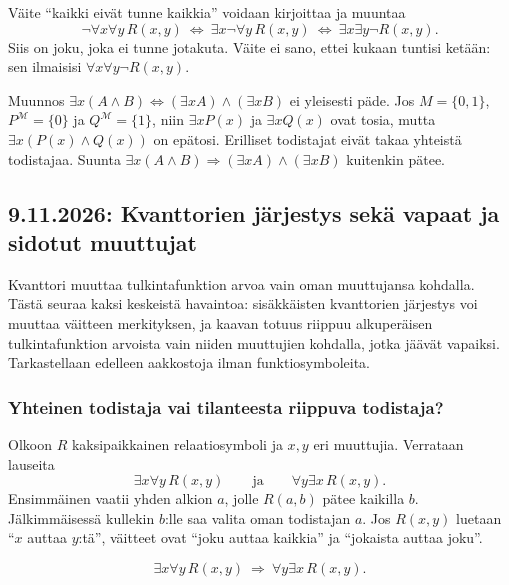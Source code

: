 \documentclass[11pt,a4paper]{amsart}
\begin{document}
\begin{example}
  Väite ``kaikki eivät tunne kaikkia'' voidaan kirjoittaa ja muuntaa
  \[
    \neg\forall x\forall y\,R(x,y)
    \ \Leftrightarrow\ \exists x\neg\forall y\,R(x,y)
    \ \Leftrightarrow\ \exists x\exists y\neg R(x,y).
  \]
  Siis on joku, joka ei tunne jotakuta. Väite ei sano, ettei kukaan
  tuntisi ketään: sen ilmaisisi $\forall x\forall y\neg R(x,y)$.
\end{example}

\begin{example}
  Muunnos $\exists x(A\land B)\Leftrightarrow
  (\exists x A)\land(\exists x B)$ ei yleisesti päde.
  Jos $M=\{0,1\}$, $P^{\mathcal M}=\{0\}$ ja
  $Q^{\mathcal M}=\{1\}$, niin $\exists x P(x)$ ja $\exists x Q(x)$
  ovat tosia, mutta $\exists x(P(x)\land Q(x))$ on epätosi.
  Erilliset todistajat eivät takaa yhteistä todistajaa.
  Suunta $\exists x(A\land B)\Rightarrow
  (\exists x A)\land(\exists x B)$ kuitenkin pätee.
\end{example}

\clearpage
\subsection{9.11.2026: Kvanttorien järjestys sekä vapaat ja sidotut muuttujat}

Kvanttori muuttaa tulkintafunktion arvoa vain oman muuttujansa kohdalla.
Tästä seuraa kaksi keskeistä havaintoa: sisäkkäisten kvanttorien järjestys
voi muuttaa väitteen merkityksen, ja kaavan totuus riippuu alkuperäisen
tulkintafunktion arvoista vain niiden muuttujien kohdalla, jotka jäävät
vapaiksi. Tarkastellaan edelleen aakkostoja ilman funktiosymboleita.

\subsubsection{Yhteinen todistaja vai tilanteesta riippuva todistaja?}

Olkoon $R$ kaksipaikkainen relaatiosymboli ja $x,y$ eri muuttujia.
Verrataan lauseita
\[
  \exists x\forall y\,R(x,y)
  \qquad\text{ja}\qquad
  \forall y\exists x\,R(x,y).
\]
Ensimmäinen vaatii yhden alkion $a$, jolle $R(a,b)$ pätee kaikilla
$b$. Jälkimmäisessä kullekin $b$:lle saa valita oman todistajan $a$.
Jos $R(x,y)$ luetaan ``$x$ auttaa $y$:tä'', väitteet ovat
``joku auttaa kaikkia'' ja ``jokaista auttaa joku''.

\begin{proposition}
  \[
    \exists x\forall y\,R(x,y)
    \ \Rightarrow\ \forall y\exists x\,R(x,y).
  \]
\end{proposition}
\end{document}
